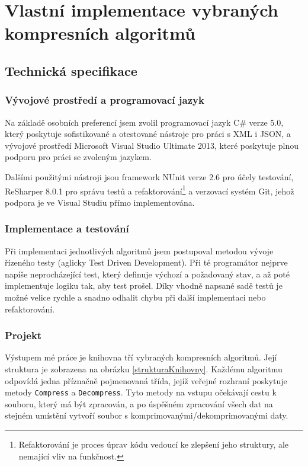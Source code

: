 \chapter{Vlastní implementace vybraných kompresních algoritmů}

\section{Technická specifikace}
\subsection{Vývojové prostředí a programovací jazyk}
Na základě osobních preferencí jsem zvolil programovací jazyk C\# verze 5.0, který poskytuje sofistikované a otestované nástroje pro práci s XML i JSON, a vývojové prostředí Microsoft Visual Studio Ultimate 2013, které poskytuje plnou podporu pro práci se zvoleným jazykem.

Dalšími použitými nástroji jsou framework NUnit verze 2.6 pro účely testování, ReSharper 8.0.1 pro správu testů a refaktorování\footnote{Refaktorování je proces úprav kódu vedoucí ke zlepšení jeho struktury, ale nemající vliv na funkčnost.} a verzovací systém Git, jehož podpora je ve Visual Studiu přímo implementována.

\subsection{Implementace a testování}
Při implementaci jednotlivých algoritmů jsem postupoval metodou vývoje řízeného testy (aglicky Test Driven Development). Při té programátor nejprve napíše neprocházející test, který definuje výchozí a požadovaný stav, a až poté implementuje logiku tak, aby test prošel. Díky vhodně napsané sadě testů je možné velice rychle a snadno odhalit chybu při další implementaci nebo refaktorování.

\subsection{Projekt}
Výstupem mé práce je knihovna tří vybraných kompresních algoritmů. Její struktura je zobrazena na obrázku \ref{strukturaKnihovny}. Každému algoritmu odpovídá jedna příznačně pojmenovaná třída, jejíž veřejné rozhraní poskytuje metody \texttt{Compress} a \texttt{Decompress}. Tyto metody na vstupu očekávají cestu k souboru, který má být zpracován, a po úspěšném zpracování všech dat na stejném umístění vytvoří soubor s komprimovanými/dekomprimovanými daty.

